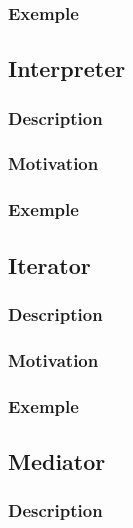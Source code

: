 \documentclass[french]{article}
\begin{document}
\subsubsection{Exemple}



\subsection{Interpreter}

\subsubsection{Description}

\subsubsection{Motivation}

\subsubsection{Exemple}



\subsection{Iterator}

\subsubsection{Description}

\subsubsection{Motivation}

\subsubsection{Exemple}



\subsection{Mediator}

\subsubsection{Description}
\end{document}
